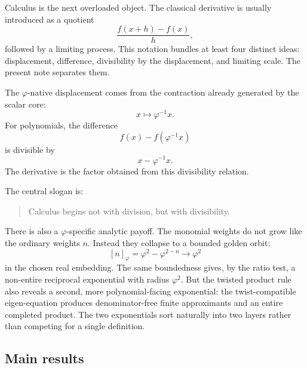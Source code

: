 \documentclass[11pt]{article}
\newcommand{\ph}{\varphi}
\begin{document}
Calculus is the next overloaded object.  The classical derivative is usually introduced as a quotient
\[
    \frac{f(x+h)-f(x)}{h},
\]
followed by a limiting process.  This notation bundles at least four distinct ideas: displacement, difference, divisibility by the displacement, and limiting scale.  The present note separates them.

The $\ph$-native displacement comes from the contraction already generated by the scalar core:
\[
    x\longmapsto \ph^{-1}x.
\]
For polynomials, the difference
\[
    f(x)-f(\ph^{-1}x)
\]
is divisible by
\[
    x-\ph^{-1}x.
\]
The derivative is the factor obtained from this divisibility relation.

The central slogan is:
\begin{quote}
Calculus begins not with division, but with divisibility.
\end{quote}

There is also a $\ph$-specific analytic payoff.  The monomial weights do not grow like the ordinary weights $n$.  Instead they collapse to a bounded golden orbit:
\[
    [n]_{\ph}=\ph^2-\ph^{2-n}\longrightarrow \ph^2
\]
in the chosen real embedding.  The same boundedness gives, by the ratio test, a non-entire reciprocal exponential with radius $\ph^2$.  But the twisted product rule also reveals a second, more polynomial-facing exponential: the twist-compatible eigen-equation produces denominator-free finite approximants and an entire completed product.  The two exponentials sort naturally into two layers rather than competing for a single definition.

\subsection*{Main results}
\end{document}
